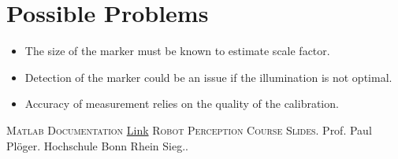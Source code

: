 \documentclass[12pt]{scrartcl}
\begin{document}
\section*{Possible Problems}

\begin{itemize}
	\item The size of the marker must be known to estimate scale factor.
	\item Detection of the marker could be an issue if the illumination is not optimal.
	\item Accuracy of measurement relies on the quality of the calibration.
\end{itemize}


\begin{thebibliography}{X}
 \textsc{Matlab Documentation}
\href{https://de.mathworks.com/help/vision/examples/evaluating-the-accuracy-of-single-camera-calibration.html#zmw57dd0e4306}{Link}
 \textsc{Robot Perception Course Slides}. Prof. Paul Pl\"oger. Hochschule Bonn Rhein Sieg..
\end{thebibliography}
\end{document}
